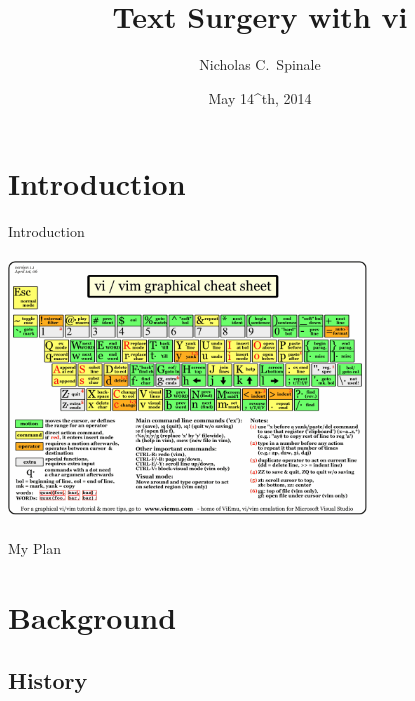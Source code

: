 \documentclass{beamer}
\title{Text Surgery with vi}
\author{Nicholas C.~Spinale}
\institute{DevX \\ Carleton College}
\date{May 14^{th}, 2014}
\begin{document}
            \begin{frame}
            \titlepage
            \end{frame}

    \section*{Introduction}

            \begin{frame}{Introduction}
                \begin{center}
                \includegraphics[width = 9.5cm, height = 7cm]{vi_vim_cheat_sheet.png}
                \end{center}
            \end{frame}

            \begin{frame}{My Plan}
            \tableofcontents
            \end{frame}

    \section{Background}

        \subsection{History}
\end{document}
